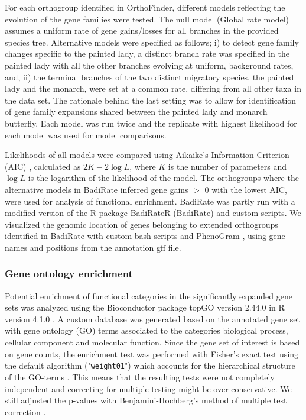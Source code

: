 \documentclass[twocolumn]{bmcart}%
\begin{document}
For each orthogroup identified in OrthoFinder, different models reflecting the evolution of the gene families were tested. The null model (Global rate model) assumes a uniform rate of gene gains/losses for all branches in the provided species tree. Alternative models were specified as follows; i) to detect gene family changes specific to the painted lady, a distinct branch rate was specified in the painted lady with all the other branches evolving at uniform, background rates, and, ii) the terminal branches of the two distinct migratory species, the painted lady and the monarch, were set at a common rate, differing from all other taxa in the data set. The rationale behind the last setting was to allow for identification of gene family expansions shared between the painted lady and monarch butterfly. Each model was run twice and the replicate with highest likelihood for each model was used for model comparisons.

Likelihoods of all models were compared using Aikaike’s Information Criterion (AIC) \citep{akaikeNewLookStatistical1974}, calculated as $2K - 2\log{L}$, where $K$ is the number of parameters and $\log{L}$ is the logarithm of the likelihood of the model. The orthogroups where the alternative models in BadiRate inferred gene gains $>$ 0 with the lowest AIC, were used for analysis of functional enrichment. BadiRate was partly run with a modified version of the R-package BadiRateR (\href{https://palfalvi.github.io/badirater/articles/badirater.html}{BadiRate}) and custom scripts. We visualized the genomic location of genes belonging to extended orthogroups identified in BadiRate with custom bash scripts and PhenoGram \citep{wolfeVisualizingGenomicInformation2013}, using gene names and positions from the annotation gff file.
\subsubsection*{Gene ontology enrichment}
Potential enrichment of functional categories in the significantly expanded gene sets was analyzed using the Bioconductor package topGO version 2.44.0 \citep{alexaTopGOEnrichmentAnalysis2021} in R version 4.1.0 \citep{rcoreteam2021.LanguageEnvironmentStatistical}. A custom database was generated based on the annotated gene set with gene ontology (GO) terms associated to the categories biological process, cellular component and molecular function. Since the gene set of interest is based on gene counts, the enrichment test was performed with Fisher’s exact test using the default algorithm ("\texttt{weight01}") which accounts for the hierarchical structure of the GO-terms \citep{alexaImprovedScoringFunctional2006}. This means that the resulting tests were not completely independent and correcting for multiple testing might be over-conservative. We still adjusted the p-values with Benjamini-Hochberg’s method of multiple test correction \citep{benjaminiControllingFalseDiscovery1995}.
\end{document}

